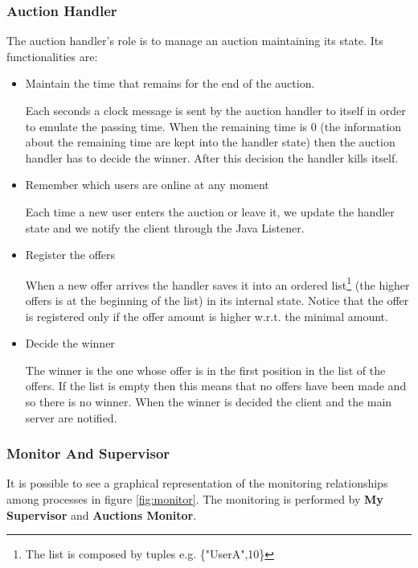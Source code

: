 \subsubsection{Auction Handler}
\noindent The auction handler's role is to manage an auction maintaining its state.
Its functionalities are:

\begin{itemize}
	\item Maintain the time that remains for the end of the auction.
	
	\noindent Each seconds a clock message is sent by the auction handler to itself in order to emulate the passing time. When the remaining time is 0 (the information about the remaining time are kept into the handler state) then the auction handler has to decide the winner. After this decision the handler kills itself.
	
	\item Remember which users are online at any moment
	
	\noindent Each time a new user enters the auction or leave it, we update the handler state and we notify the client through the Java Listener. 
	
	\item Register the offers
	
	\noindent When a new offer arrives the handler saves it into an ordered list\footnote{The list is composed by tuples e.g. \{"UserA",10\}} (the higher offers is at the beginning of the list) in its internal state. Notice that the offer is registered only if the offer amount is higher w.r.t. the minimal amount.
	
	
	\item Decide the winner
	
	\noindent The winner is the one whose offer is in the first position in the list of the offers. If the list is empty then this means that no offers have been made and so there is no winner. When the winner is decided the client and the main server are notified.
	\noindent
\end{itemize}

\subsubsection{Monitor And Supervisor} \label{Monitoring}
\noindent It is possible to see a graphical representation of the monitoring relationships among processes in figure \ref{fig:monitor}. \noindent The monitoring is performed by \textbf{My Supervisor} and \textbf{Auctions Monitor}.

